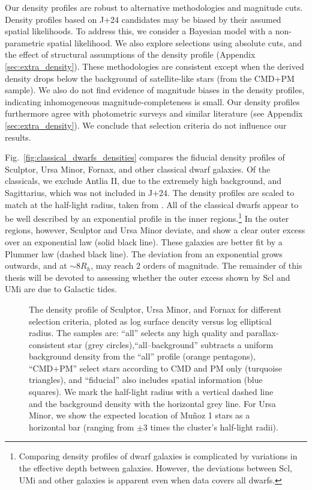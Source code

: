 Our density profiles are robust to alternative methodologies and
magnitude cuts. Density profiles based on J+24 candidates may be biased
by their assumed spatial likelihoods. To address this, we consider a
Bayesian model with a non-parametric spatial likelihood. We also explore
selections using absolute cuts, and the effect of structural assumptions
of the density profile (Appendix \ref{sec:extra_density}). These
methodologies are consistent except when the derived density drops below
the background of satellite-like stars (from the CMD+PM sample). We also
do not find evidence of magnitude biases in the density profiles,
indicating inhomogeneous magnitude-completeness is small. Our density
profiles furthermore agree with photometric surveys and similar
literature (see Appendix \ref{sec:extra_density}). We conclude that
selection criteria do not influence our results.

Fig.~\ref{fig:classical_dwarfs_densities} compares the fiducial density
profiles of Sculptor, Ursa Minor, Fornax, and other classical dwarf
galaxies. Of the classicals, we exclude Antlia II, due to the extremely
high background, and Sagittarius, which was not included in J+24. The
density profiles are scaled to match at the half-light radius, taken
from \citet{munoz+2018}. All of the classical dwarfs appear to be well
described by an exponential profile in the inner regions.\footnote{Comparing
  density profiles of dwarf galaxies is complicated by variations in the
  effective depth between galaxies. However, the deviations between Scl,
  UMi and other galaxies is apparent even when data covers all dwarfs.}
In the outer regions, however, Sculptor and Ursa Minor deviate, and show
a clear outer excess over an exponential law (solid black line). These
galaxies are better fit by a Plummer law (dashed black line). The
deviation from an exponential grows outwards, and at \(\sim 8 R_h\), may
reach 2 orders of magnitude. The remainder of this thesis will be
devoted to assessing whether the outer excess shown by Scl and UMi are
due to Galactic tides.

\begin{figure}
\centering
{}
\caption[Density profiles for different Gaia samples]{The density
profile of Sculptor, Ursa Minor, and Fornax for different selection
criteria, ploted as log surface dencity versus log elliptical radius.
The samples are: ``all'' selects any high quality and
parallax-consistent star (grey circles),``all--background'' subtracts a
uniform background density from the ``all'' profile (orange pentagons),
``CMD+PM'' select stars according to CMD and PM only (turquoise
triangles), and ``fiducial'' also includes spatial information (blue
squares). We mark the half-light radius with a vertical dashed line and
the background density with the horizontal grey line. For Ursa Minor, we
show the expected location of Muñoz 1 stars as a horizontal bar (ranging
from \(\pm3\) times the cluster's half-light
radii).}\label{fig:scl_observed_profiles}
\end{figure}

